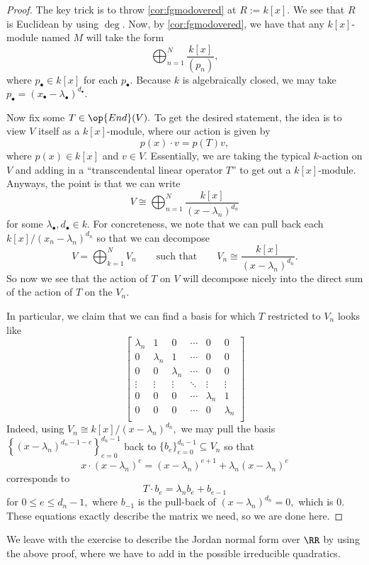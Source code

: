 \documentclass[../notes.tex]{subfiles}
\begin{document}
\begin{proof}
	The key trick is to throw \autoref{cor:fgmodovered} at $R:=k[x].$ We see that $R$ is Euclidean by using $\deg.$ Now, by \autoref{cor:fgmodovered}, we have that any $k[x]$-module named $M$ will take the form
	\[\bigoplus_{n=1}^N\frac{k[x]}{(p_n)},\]
	where $p_\bullet\in k[x]$ for each $p_\bullet.$ Because $k$ is algebraically closed, we may take $p_\bullet=(x_\bullet-\lambda_\bullet)^{d_\bullet}.$

	Now fix some $T\in\op{End}(V).$ To get the desired statement, the idea is to view $V$ itself as a $k[x]$-module, where our action is given by
	\[p(x)\cdot v=p(T)v,\]
	where $p(x)\in k[x]$ and $v\in V.$ Essentially, we are taking the typical $k$-action on $V$ and adding in a ``transcendental linear operator $T$'' to get out a $k[x]$-module. Anyways, the point is that we can write
	\[V\cong\bigoplus_{n=1}^N\frac{k[x]}{(x-\lambda_n)^{d_n}}\]
	for some $\lambda_\bullet,d_\bullet\in k.$ For concreteness, we note that we can pull back each $k[x]/(x_n-\lambda_n)^{d_n}$ so that we can decompose
	\[V=\bigoplus_{k=1}^NV_n\qquad\text{such that}\qquad V_n\cong\frac{k[x]}{(x-\lambda_n)^{d_n}}.\]
	So now we see that the action of $T$ on $V$ will decompose nicely into the direct sum of the action of $T$ on the $V_n.$

	In particular, we claim that we can find a basis for which $T$ restricted to $V_n$ looks like
	\[\begin{bmatrix}
		\lambda_n & 1 & 0 & \cdots & 0 & 0 \\
		0 & \lambda_n & 1 & \cdots & 0 & 0 \\
		0 & 0 & \lambda_n & \cdots & 0 & 0 \\
		\vdots & \vdots & \vdots & \ddots & \vdots & \vdots \\
		0 & 0 & 0 & \cdots & \lambda_n & 1 \\
		0 & 0 & 0 & \cdots & 0 & \lambda_n \\
	\end{bmatrix}\]
	Indeed, using $V_n\cong k[x]/(x-\lambda_n)^{d_n},$ we may pull the basis $\left\{(x-\lambda_n)^{d_n-1-e}\right\}_{e=0}^{d_n-1}$ back to $\{b_e\}_{e=0}^{d_n-1}\subseteq V_n$ so that
	\[x\cdot(x-\lambda_n)^e=(x-\lambda_n)^{e+1}+\lambda_n(x-\lambda_n)^e\]
	corresponds to
	\[T\cdot b_e=\lambda_nb_e+b_{e-1}\]
	for $0\le e\le d_n-1,$ where $b_{-1}$ is the pull-back of $(x-\lambda_n)^{d_n}=0,$ which is $0.$ These equations exactly describe the matrix we need, so we are done here.
\end{proof}
We leave with the exercise to describe the Jordan normal form over $\RR$ by using the above proof, where we have to add in the possible irreducible quadratics.
\end{document}
